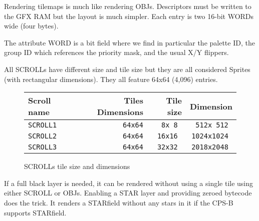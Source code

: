 Rendering tilemaps is much like rendering OBJs. Descriptors must be written to the GFX RAM but the layout is much simpler. Each entry is two 16-bit WORDs wide (four bytes).

 

The attribute WORD is a bit field where we find in particular the palette ID, the group ID which references the priority mask, and the usual X/Y flippers.

 

All SCROLLs have different size and tile size but they are all considered Sprites (with rectangular dimensions). They all feature 64x64 (4,096) entries. 

 \begin{figure}[H]
\begin{tabularx}{\textwidth}{Xrrr}
  \toprule    
  \textbf{Scroll name } & \textbf{ Tiles Dimensions } & \textbf{ Tile size }  & \textbf{Dimension }\\  
  \toprule   
    
\texttt{SCROLL1} & \texttt{64x64} & \texttt{8x 8 } &  \texttt{512x 512 }  \\  
\texttt{SCROLL2} & \texttt{64x64} & \texttt{16x16 } &  \texttt{1024x1024 }   \\  
\texttt{SCROLL3} & \texttt{64x64} & \texttt{32x32 } &  \texttt{2018x2048 }   \\  
  \toprule   
\end{tabularx}
\vspace*{-1mm} %
\caption*{SCROLLs tile size and dimensions}
\end{figure}

If a full black layer is needed, it can be rendered without using a single tile using either SCROLL or OBJs. Enabling a STAR layer and providing zeroed bytecode does the trick. It renders a STARfield without any stars in it if the CPS-B supports STARfield.
























